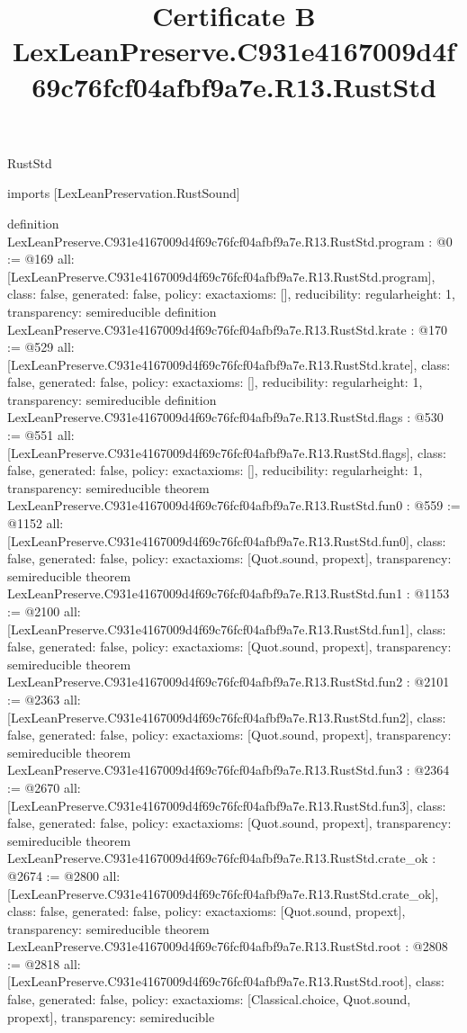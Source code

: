 \begin{lexlean}{RustStd}
\title{Certificate B LexLeanPreserve.C931e4167009d4f69c76fcf04afbf9a7e.R13.RustStd}
\begin{coremodule}
imports [LexLeanPreservation.RustSound]

definition LexLeanPreserve.C931e4167009d4f69c76fcf04afbf9a7e.R13.RustStd.program : @0 := @169 {
  all: [LexLeanPreserve.C931e4167009d4f69c76fcf04afbf9a7e.R13.RustStd.program],
  class: false,
  generated: false,
  policy: exact{axioms: []},
  reducibility: regular{height: 1},
  transparency: semireducible
}
definition LexLeanPreserve.C931e4167009d4f69c76fcf04afbf9a7e.R13.RustStd.krate : @170 := @529 {
  all: [LexLeanPreserve.C931e4167009d4f69c76fcf04afbf9a7e.R13.RustStd.krate],
  class: false,
  generated: false,
  policy: exact{axioms: []},
  reducibility: regular{height: 1},
  transparency: semireducible
}
definition LexLeanPreserve.C931e4167009d4f69c76fcf04afbf9a7e.R13.RustStd.flags : @530 := @551 {
  all: [LexLeanPreserve.C931e4167009d4f69c76fcf04afbf9a7e.R13.RustStd.flags],
  class: false,
  generated: false,
  policy: exact{axioms: []},
  reducibility: regular{height: 1},
  transparency: semireducible
}
theorem LexLeanPreserve.C931e4167009d4f69c76fcf04afbf9a7e.R13.RustStd.fun0 : @559 := @1152 {
  all: [LexLeanPreserve.C931e4167009d4f69c76fcf04afbf9a7e.R13.RustStd.fun0],
  class: false,
  generated: false,
  policy: exact{axioms: [Quot.sound, propext]},
  transparency: semireducible
}
theorem LexLeanPreserve.C931e4167009d4f69c76fcf04afbf9a7e.R13.RustStd.fun1 : @1153 := @2100 {
  all: [LexLeanPreserve.C931e4167009d4f69c76fcf04afbf9a7e.R13.RustStd.fun1],
  class: false,
  generated: false,
  policy: exact{axioms: [Quot.sound, propext]},
  transparency: semireducible
}
theorem LexLeanPreserve.C931e4167009d4f69c76fcf04afbf9a7e.R13.RustStd.fun2 : @2101 := @2363 {
  all: [LexLeanPreserve.C931e4167009d4f69c76fcf04afbf9a7e.R13.RustStd.fun2],
  class: false,
  generated: false,
  policy: exact{axioms: [Quot.sound, propext]},
  transparency: semireducible
}
theorem LexLeanPreserve.C931e4167009d4f69c76fcf04afbf9a7e.R13.RustStd.fun3 : @2364 := @2670 {
  all: [LexLeanPreserve.C931e4167009d4f69c76fcf04afbf9a7e.R13.RustStd.fun3],
  class: false,
  generated: false,
  policy: exact{axioms: [Quot.sound, propext]},
  transparency: semireducible
}
theorem LexLeanPreserve.C931e4167009d4f69c76fcf04afbf9a7e.R13.RustStd.crate_ok : @2674 := @2800 {
  all: [LexLeanPreserve.C931e4167009d4f69c76fcf04afbf9a7e.R13.RustStd.crate_ok],
  class: false,
  generated: false,
  policy: exact{axioms: [Quot.sound, propext]},
  transparency: semireducible
}
theorem LexLeanPreserve.C931e4167009d4f69c76fcf04afbf9a7e.R13.RustStd.root : @2808 := @2818 {
  all: [LexLeanPreserve.C931e4167009d4f69c76fcf04afbf9a7e.R13.RustStd.root],
  class: false,
  generated: false,
  policy: exact{axioms: [Classical.choice, Quot.sound, propext]},
  transparency: semireducible
}


\end{coremodule}
\end{lexlean}

